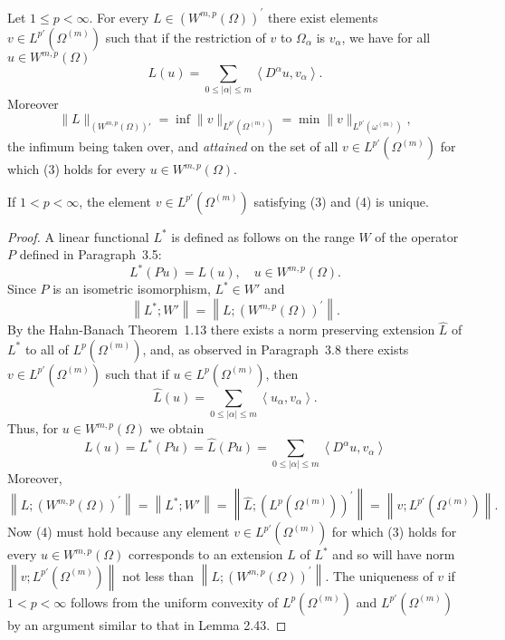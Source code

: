 \begin{theorem}
  Let $1 \leq p<\infty$. For every $L \in\left(W^{m, p}(\Omega)\right)^{\prime}$ there exist 
  elements $v \in L^{p'}(\Omega^{(m)})$ such that if the restriction of $v$ to 
  $\Omega_\alpha$ is $v_\alpha$, we have for all $u \in W^{m, p}(\Omega)$
  \begin{equation}\label{eq:3.3}
  L(u)=\sum_{0 \leq|\alpha| \leq m}\left\langle D^\alpha u, v_\alpha\right\rangle .
  \end{equation}
  Moreover
  \begin{equation}\label{eq:3.4}
    \|L\|_{(W^{m,p}(\Omega))'} = \inf \|v\|_{L^{p'}(\Omega^{(m)})}
    = \min \|v\|_{L^{p'}(\omega^{(m)})},
  \end{equation}
  the infimum being taken over, and \emph{attained} on the set of all $v\in L^{p'}(\Omega^{(m)})$
  for which (3) holds for every $u\in W^{m,p}(\Omega)$.

  If $1<p<\infty$, the element $v \in L^{p'}(\Omega^{(m)})$ satisfying (3) and (4) is unique.
\end{theorem}


\begin{proof}
  A linear functional $L^*$ is defined as follows on the range $W$ of the operator $P$
  defined in Paragraph~3.5:
  \[
  L^*(Pu) = L(u), \quad u \in W^{m, p}(\Omega) .
  \]
  Since $P$ is an isometric isomorphism, $L^* \in W'$ and
  \[
  \left\|L^* ; W'\right\|=\left\|L ;\left(W^{m, p}(\Omega)\right)^{\prime}\right\| .
  \]
  By the Hahn-Banach Theorem~1.13 there exists a norm preserving extension $\hat{L}$ of $L^*$
  to all of $L^p(\Omega^{(m)})$, and, as observed in Paragraph~3.8
  there exists $v \in L^{p'}(\Omega^{(m)})$ such that if $u \in L^p(\Omega^{(m)})$, then
  \[
  \hat{L}(u) = \sum_{0 \leq|\alpha| \leq m}\left\langle u_\alpha, v_\alpha\right\rangle .
  \]
  Thus, for $u \in W^{m, p}(\Omega)$ we obtain
  \[
  L(u)=L^*(P u)=\hat{L}(P u)=\sum_{0 \leq|\alpha| \leq m}\left\langle D^\alpha u, v_\alpha\right\rangle
  \]
  Moreover,
  \[
  \left\|L ;\left(W^{m, p}(\Omega)\right)^{\prime}\right\|
    = \left\|L^* ; W'\right\|
    = \left\|\hat{L} ;\left(L^p(\Omega^{(m)})\right)^{\prime}\right\|
    = \left\|v ; L^{p'}(\Omega^{(m)})\right\| .
  \]
  Now (4) must hold because any element $v \in L^{p'}(\Omega^{(m)})$ for which (3) holds for every $u \in W^{m, p}(\Omega)$ corresponds to an extension $L$ of $L^*$ and so will have norm $\left\|v ; L^{p'}(\Omega^{(m)})\right\|$ not less than $\left\|L ;\left(W^{m, p}(\Omega)\right)^{\prime}\right\|$.
  The uniqueness of $v$ if $1<p<\infty$ follows from the uniform convexity of $L^p(\Omega^{(m)})$ and $L^{p'}(\Omega^{(m)})$ by an argument similar to that in Lemma 2.43.
\end{proof}



